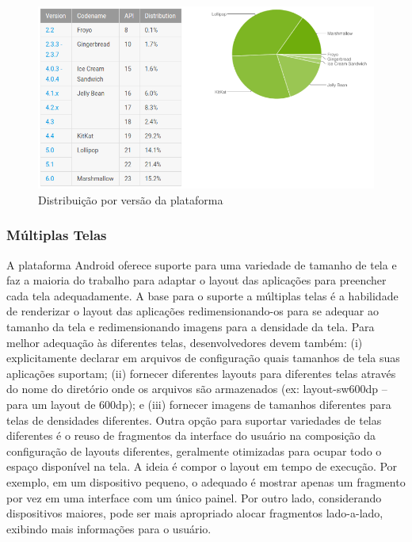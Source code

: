 \begin{figure}[ht]
\centering
\includegraphics[width=1\textwidth]{imagens/platform_versions.png}
\caption{Distribuição por versão da plataforma \cite{Dashboard}}
\label{fig:platform_versions}
\end{figure}

\subsubsection{Múltiplas Telas}
A plataforma Android oferece suporte para uma variedade de tamanho de tela e faz
a maioria do trabalho para adaptar o layout das aplicações para preencher cada tela
adequadamente. A base para o suporte a múltiplas telas é a habilidade de renderizar
o layout das aplicações redimensionando-os para se adequar ao tamanho da tela e
redimensionando imagens para a densidade da tela. Para melhor adequação às diferentes
telas, desenvolvedores devem também: (i) explicitamente declarar em arquivos de
configuração quais tamanhos de tela suas aplicações suportam; (ii) fornecer diferentes
layouts para diferentes telas através do nome do diretório onde os arquivos são
armazenados (ex: layout-sw600dp – para um layout de 600dp); e (iii) fornecer
imagens de tamanhos diferentes para telas de densidades diferentes. Outra opção
para suportar variedades de telas diferentes é o reuso de fragmentos da interface
do usuário na composição da configuração de layouts diferentes, geralmente
otimizadas para ocupar todo o espaço disponível na tela. A ideia é compor o
layout em tempo de execução. Por exemplo, em um dispositivo pequeno, o adequado
é mostrar apenas um fragmento por vez em uma interface com um único painel.
Por outro lado, considerando dispositivos maiores, pode ser mais apropriado alocar
fragmentos lado-a-lado, exibindo mais informações para o usuário.

